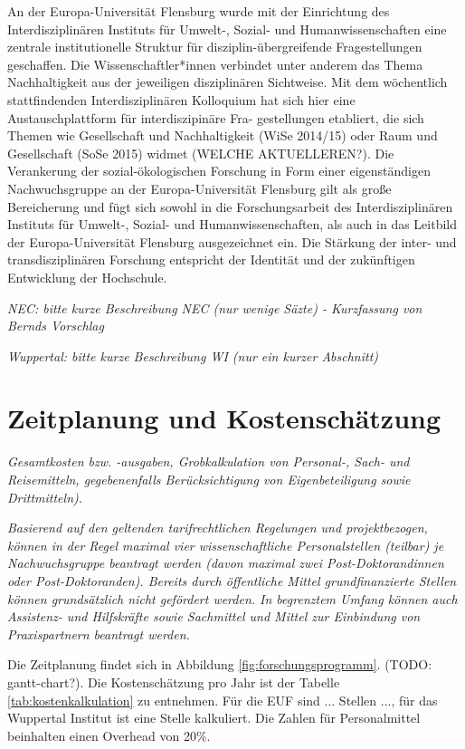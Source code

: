 \documentclass[a4paper,11pt,twoside]{scrartcl}
\begin{document}
An der Europa-Universität Flensburg wurde mit der Einrichtung des Interdisziplinären Instituts für Umwelt-, Sozial- und Humanwissenschaften eine zentrale institutionelle Struktur für disziplin-übergreifende Fragestellungen geschaffen. Die Wissenschaftler*innen verbindet unter anderem das Thema Nachhaltigkeit aus der jeweiligen disziplinären Sichtweise. Mit dem wöchentlich stattfindenden Interdisziplinären Kolloquium hat sich hier eine Austauschplattform für interdiszipinäre Fra-
gestellungen etabliert, die sich Themen wie Gesellschaft und Nachhaltigkeit (WiSe 2014/15) oder Raum und Gesellschaft (SoSe 2015) widmet (WELCHE AKTUELLEREN?). Die Verankerung der sozial-ökologischen Forschung in Form einer eigenständigen Nachwuchsgruppe an der Europa-Universität Flensburg gilt als große Bereicherung und fügt sich sowohl in die Forschungsarbeit des Interdisziplinären Instituts für Umwelt-, Sozial- und Humanwissenschaften, als auch in das Leitbild der Europa-Universität Flensburg ausgezeichnet ein. Die Stärkung der inter- und transdisziplinären Forschung entspricht der Identität und der zukünftigen Entwicklung der Hochschule.

\textit{NEC: bitte kurze Beschreibung NEC (nur wenige Säzte) - Kurzfassung von Bernds Vorschlag}

\textit{Wuppertal: bitte kurze Beschreibung WI (nur ein kurzer Abschnitt)}


\section{Zeitplanung und Kostenschätzung}
\textit{Gesamtkosten bzw. -ausgaben, Grobkalkulation von Personal-, Sach- und Reisemitteln, gegebenenfalls Berücksichtigung von Eigenbeteiligung sowie Drittmitteln).}

\textit{Basierend auf den geltenden tarifrechtlichen Regelungen und projektbezogen, können in der Regel maximal vier wissenschaftliche Personalstellen (teilbar) je Nachwuchsgruppe beantragt werden (davon maximal zwei Post-Doktorandinnen oder Post-Doktoranden). Bereits durch öffentliche Mittel grundfinanzierte Stellen können grundsätzlich nicht gefördert werden.
In begrenztem Umfang können auch Assistenz- und Hilfskräfte sowie Sachmittel und Mittel zur Einbindung von Praxispartnern beantragt werden.}

Die Zeitplanung findet sich in Abbildung \ref{fig:forschungsprogramm}. (TODO: gantt-chart?). Die Kostenschätzung pro Jahr ist der Tabelle \ref{tab:kostenkalkulation} zu entnehmen. Für die EUF sind ... Stellen ..., für das Wuppertal Institut ist eine Stelle kalkuliert. Die Zahlen für Personalmittel beinhalten einen Overhead von 20\%.
\end{document}
